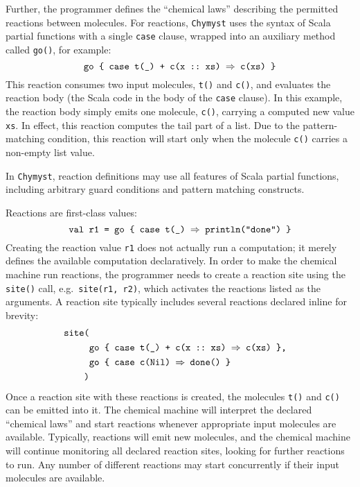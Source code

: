 \documentclass[sigplan,10pt,review,anonymous]{acmart}\settopmatter{printfolios=true}
\begin{document}
Further, the programmer defines the ``chemical laws'' describing
the permitted reactions between molecules. For reactions, \texttt{Chymyst}
uses the syntax of Scala partial functions with a single \texttt{case}
clause, wrapped into an auxiliary method called \texttt{go()}, for
example:
\[
\text{\texttt{go \{ case t(\_) + c(x ::~xs) \ensuremath{\Rightarrow} c(xs) \}}}
\]
This reaction consumes two input molecules, \texttt{t()} and \texttt{c()},
and evaluates the reaction body (the Scala code in the body of the
\texttt{case} clause). In this example, the reaction body simply emits
one molecule, \texttt{c()}, carrying a computed new value \texttt{xs}.
In effect, this reaction computes the tail part of a list.
Due to the pattern-matching condition, this reaction will start only
when the molecule \texttt{c()} carries a non-empty list value.

In \texttt{Chymyst}, reaction definitions may use all features of
Scala partial functions, including arbitrary guard conditions and
pattern matching constructs.

Reactions are first-class values:
\[
\text{\texttt{val r1 = go \{ case t(\_) \ensuremath{\Rightarrow} println("done") \}}}
\]
Creating the reaction value \texttt{r1} does not actually run a computation;
it merely defines the available computation declaratively. In order
to make the chemical machine run reactions, the programmer needs to
create a reaction site using the \texttt{site()} call, e.g.~\texttt{site(r1,
r2)}, which activates the reactions listed as the arguments. A reaction
site typically includes several reactions declared inline for brevity:
\begin{align*}
\text{\texttt{site(}}\\
 & \text{\texttt{go \{ case t(\_) + c(x ::~xs) \ensuremath{\Rightarrow} c(xs) \},}}\\
 & \text{\text{\texttt{go \{ case c(Nil) }}\texttt{\ensuremath{\Rightarrow} done() \}}}\\
\text{\texttt{)}}
\end{align*}
Once a reaction site with these reactions is created, the molecules
\texttt{t()} and \texttt{c()} can be emitted into it. The chemical
machine will interpret the declared ``chemical laws'' and start
reactions whenever appropriate input molecules are available. Typically,
reactions will emit new molecules, and the chemical machine will continue
monitoring all declared reaction sites, looking for further reactions
to run. Any number of
different reactions may start concurrently if their input molecules
are available.
\end{document}
